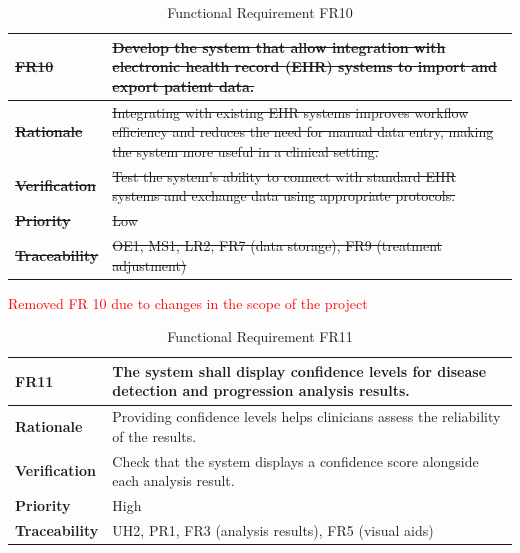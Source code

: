 \documentclass[12pt]{article}
\begin{document}
\begin{table}[h!]
\centering
{}
\begin{tabular}{|p{3.5cm}|p{11.5cm}|}
\hline
\rowcolor{gray!30}
\sout{\textbf{FR10}} & \sout{Develop the system that allow integration with electronic health record (EHR) systems to import and export patient data.} \\
\hline
\sout{\textbf{Rationale}} & \sout{Integrating with existing EHR systems improves workflow efficiency and reduces the need for manual data entry, making the system more useful in a clinical setting.} \\
\hline
\sout{\textbf{Verification}} & \sout{Test the system's ability to connect with standard EHR systems and exchange data using appropriate protocols.} \\
\hline
\sout{\textbf{Priority}} & \sout{Low} \\
\hline
\sout{\textbf{Traceability}} & \sout{OE1, MS1, LR2, FR7 (data storage), FR9 (treatment adjustment)} \\
\hline
\end{tabular}
\caption{Functional Requirement FR10}
\textcolor{red}{Removed FR 10 due to changes in the scope of the project}
\end{table}
\begin{table}[h!]
\centering
{}
\begin{tabular}{|p{3.5cm}|p{11.5cm}|}
\hline
\rowcolor{gray!30}
\textbf{FR11} & The system shall display confidence levels for disease detection and progression analysis results. \\
\hline
\textbf{Rationale} & Providing confidence levels helps clinicians assess the reliability of the results. \\
\hline
\textbf{Verification} & Check that the system displays a confidence score alongside each analysis result. \\
\hline
\textbf{Priority} & High \\
\hline
\textbf{Traceability} & UH2, PR1, FR3 (analysis results), FR5 (visual aids) \\
\hline
\end{tabular}
\caption{Functional Requirement FR11}
\end{table}
\end{document}
